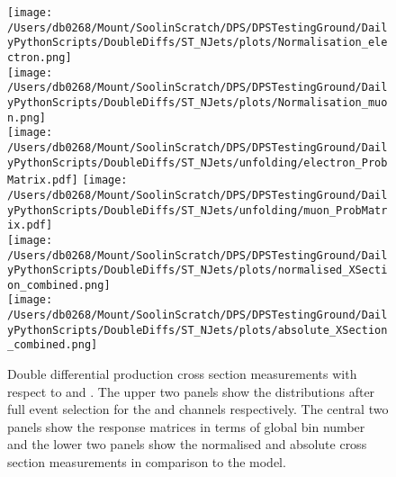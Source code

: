 \begin{figure}[htpb]
	\centering
	\texttt{[image: /Users/db0268/Mount/SoolinScratch/DPS/DPSTestingGround/DailyPythonScripts/DoubleDiffs/ST\_NJets/plots/Normalisation\_electron.png]} \\
	\texttt{[image: /Users/db0268/Mount/SoolinScratch/DPS/DPSTestingGround/DailyPythonScripts/DoubleDiffs/ST\_NJets/plots/Normalisation\_muon.png]} \\
	\vspace{0.8cm}
	\texttt{[image: /Users/db0268/Mount/SoolinScratch/DPS/DPSTestingGround/DailyPythonScripts/DoubleDiffs/ST\_NJets/unfolding/electron\_ProbMatrix.pdf]}
	\texttt{[image: /Users/db0268/Mount/SoolinScratch/DPS/DPSTestingGround/DailyPythonScripts/DoubleDiffs/ST\_NJets/unfolding/muon\_ProbMatrix.pdf]} \\
	\vspace{0.8cm}
	\texttt{[image: /Users/db0268/Mount/SoolinScratch/DPS/DPSTestingGround/DailyPythonScripts/DoubleDiffs/ST\_NJets/plots/normalised\_XSection\_combined.png]} \\
	\texttt{[image: /Users/db0268/Mount/SoolinScratch/DPS/DPSTestingGround/DailyPythonScripts/DoubleDiffs/ST\_NJets/plots/absolute\_XSection\_combined.png]} \\
	\vspace{0.4cm}
	\caption[Double differential \ttbar{} production cross section measurements with respect to \ST{} and \NJET{}. The upper two panels show the distributions after full event selection for the \eJets{} and \muJets{} channels respectively. The central two panels show the response matrices in terms of global bin number and the lower two panels show the normalised and absolute cross section measurements in comparison to the \powhegpythia{} model.]{Double differential \ttbar{} production cross section measurements with respect to \ST{} and \NJET{}. The upper two panels show the distributions after full event selection for the \eJets{} and \muJets{} channels respectively. The central two panels show the response matrices in terms of global bin number and the lower two panels show the normalised and absolute cross section measurements in comparison to the \powhegpythia{} model.}
	\label{fig:ST_NJET}
\end{figure}

